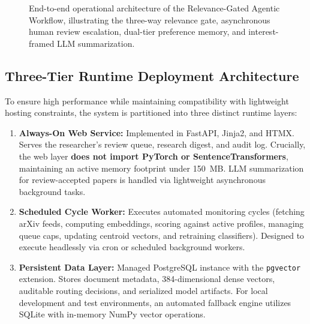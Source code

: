 \begin{figure}[t]
{%
}
\caption{End-to-end operational architecture of the Relevance-Gated Agentic Workflow, illustrating the three-way relevance gate, asynchronous human review escalation, dual-tier preference memory, and interest-framed LLM summarization.}
\label{fig:architecture}
\end{figure}

\subsection{Three-Tier Runtime Deployment Architecture}
\label{sec:three_tier}

To ensure high performance while maintaining compatibility with lightweight hosting constraints, the system is partitioned into three distinct runtime layers:
\begin{enumerate}
    \item \textbf{Always-On Web Service:} Implemented in FastAPI, Jinja2, and HTMX. Serves the researcher's review queue, research digest, and audit log. Crucially, the web layer \textbf{does not import PyTorch or SentenceTransformers}, maintaining an active memory footprint under 150~MB. LLM summarization for review-accepted papers is handled via lightweight asynchronous background tasks.
    \item \textbf{Scheduled Cycle Worker:} Executes automated monitoring cycles (fetching arXiv feeds, computing embeddings, scoring against active profiles, managing queue caps, updating centroid vectors, and retraining classifiers). Designed to execute headlessly via cron or scheduled background workers.
    \item \textbf{Persistent Data Layer:} Managed PostgreSQL instance with the \texttt{pgvector} extension. Stores document metadata, 384-dimensional dense vectors, auditable routing decisions, and serialized model artifacts. For local development and test environments, an automated fallback engine utilizes SQLite with in-memory NumPy vector operations.
\end{enumerate}


